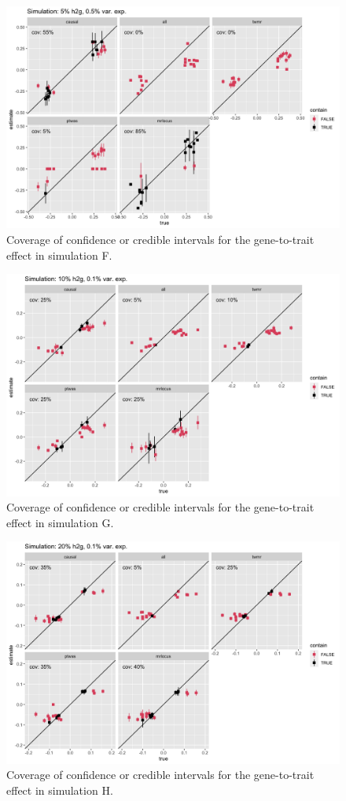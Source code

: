 \documentclass[11pt]{article}
\begin{document}
\begin{figure}[!ht]
  \centering
  \includegraphics[width=.8\textwidth]{figs/cover8.png}
  \caption{Coverage of confidence or credible intervals for the
    gene-to-trait effect in simulation F.}
\end{figure}

\begin{figure}[!ht]
  \centering
  \includegraphics[width=.8\textwidth]{figs/cover5.png}
  \caption{Coverage of confidence or credible intervals for the
    gene-to-trait effect in simulation G.}
\end{figure}

\begin{figure}[!ht]
  \centering
  \includegraphics[width=.8\textwidth]{figs/cover7.png}
  \caption{Coverage of confidence or credible intervals for the
    gene-to-trait effect in simulation H.}
\end{figure}
\end{document}
